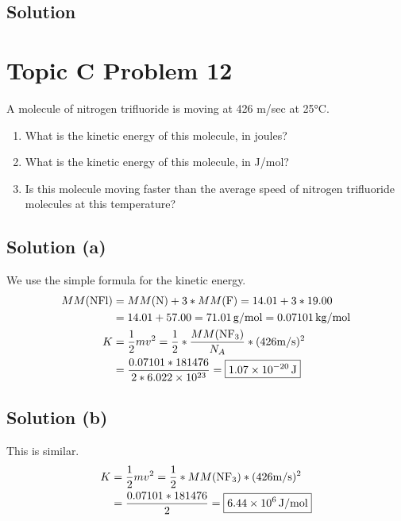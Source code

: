 \documentclass[10pt]{article}
\newcommand{\E}[1]{\times 10^{#1}}
\begin{document}
        \subsection{Solution}

    \pagebreak
    \section{Topic C Problem 12}
        A molecule of nitrogen trifluoride is moving at 426 m/sec at 25\unit{\celsius}.
        \begin{enumerate} [label=\alph*)]
            \item What is the kinetic energy of this molecule, in joules?
            \item What is the kinetic energy of this molecule, in J/mol?
            \item Is this molecule moving faster than the average speed of nitrogen trifluoride molecules at this temperature?
        \end{enumerate}

        \subsection{Solution (a)}
            We use the simple formula for the kinetic energy. 
            \begin{align}
                MM(\ce{NFl})   &=  MM(\ce{N}) + 3 * MM(\ce{F})
                    =   14.01 + 3 * 19.00\\
                    &=  14.01 + 57.00
                    =   71.01\,\unit{\gram/\mole}
                    =   0.07101\,\unit{\kilo\gram/\mole}\\
                K   &=  \frac{1}{2}mv^2
                    =   \frac{1}{2} * \frac{MM(\ce{NF3})}{N_A} * (426\unit{\meter/\second})^2\\
                    &=  \frac{0.07101 * 181476}{2 * 6.022\E{23}}
                    =   \boxed{1.07\E{-20}\,\unit{\joule}}
            \end{align}

        \subsection{Solution (b)}
            This is similar.
            \begin{align}
                K   &=  \frac{1}{2}mv^2
                    =   \frac{1}{2} * MM(\ce{NF3}) * (426\unit{\meter/\second})^2\\
                    &=  \frac{0.07101 * 181476}{2}
                    =   \boxed{6.44\E{6}\,\unit{\joule/\mole}}
            \end{align}
\end{document}
